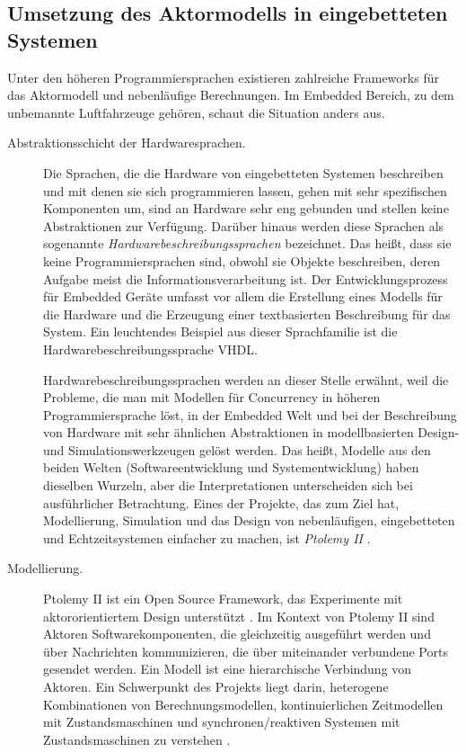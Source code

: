 \subsection{Umsetzung des Aktormodells in eingebetteten Systemen}

Unter den höheren Programmiersprachen existieren zahlreiche Frameworks für das Aktormodell und nebenläufige Berechnungen. Im Embedded Bereich, zu dem unbemannte Luftfahrzeuge gehören, schaut die Situation anders aus.

\begin{description} 
	\item[Abstraktionsschicht der Hardwaresprachen.] Die Sprachen, die die Hardware von eingebetteten Systemen beschreiben und mit denen sie sich programmieren lassen, gehen mit sehr spezifischen Komponenten um, sind an Hardware sehr eng gebunden und stellen keine Abstraktionen zur Verfügung. Darüber hinaus werden diese Sprachen als sogenannte \textit{Hardwarebeschreibungssprachen} bezeichnet. Das heißt, dass sie keine Programmiersprachen sind, obwohl sie Objekte beschreiben, deren Aufgabe meist die Informationsverarbeitung ist. Der Entwicklungsprozess für Embedded Geräte umfasst vor allem die Erstellung eines Modells für die Hardware und die Erzeugung einer textbasierten Beschreibung für das System. Ein leuchtendes Beispiel aus dieser Sprachfamilie ist die Hardwarebeschreibungssprache VHDL.
	
	Hardwarebeschreibungssprachen werden an dieser Stelle erwähnt, weil die Probleme, die man mit Modellen für Concurrency in höheren Programmiersprache löst, in der Embedded Welt und bei der Beschreibung von Hardware mit sehr ähnlichen Abstraktionen in modellbasierten Design- und Simulationswerkzeugen gelöst werden. Das heißt, Modelle aus den beiden Welten (Softwareentwicklung und Systementwicklung) haben dieselben Wurzeln, aber die Interpretationen unterscheiden sich bei ausführlicher Betrachtung. Eines der Projekte, das zum Ziel hat, Modellierung, Simulation und das Design von nebenläufigen, eingebetteten und Echtzeitsystemen einfacher zu machen, ist \textit{Ptolemy II} \cite{Brooks05heterogeneousconcurrent}.
	
	
	\item[Modellierung.] Ptolemy II ist ein Open Source Framework, das Experimente mit aktororientiertem Design unterstützt \cite{Brooks05heterogeneousconcurrent}. Im Kontext von Ptolemy II sind Aktoren Softwarekomponenten, die gleichzeitig ausgeführt werden und über Nachrichten kommunizieren, die über miteinander verbundene Ports gesendet werden. Ein Modell ist eine hierarchische Verbindung von Aktoren. Ein Schwerpunkt des Projekts liegt darin, heterogene Kombinationen von Berechnungsmodellen, kontinuierlichen Zeitmodellen mit Zustandsmaschinen und synchronen/reaktiven Systemen mit Zustandsmaschinen zu verstehen \cite{Xiong02anextensible}.
	

\end{description}
